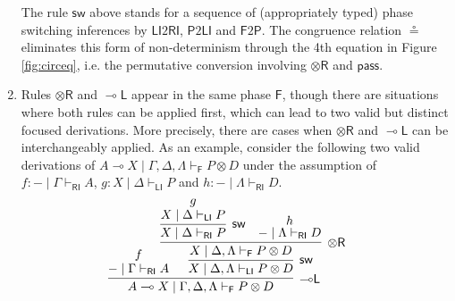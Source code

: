 \documentclass[copyright,creativecommons]{eptcs}
\theoremstyle{definition}
\newcommand{\tr}{\otimes \mathsf{R}}
\newcommand{\lleft}{{\multimap}\mathsf{L}}
\newcommand{\pass}{\mathsf{pass}}
\newcommand{\ot}{\otimes}
\newcommand{\lolli}{\multimap}
\newcommand{\RI}{\mathsf{RI}}
\newcommand{\LI}{\mathsf{LI}}
\newcommand{\Pass}{\mathsf{P}}
\newcommand{\F}{\mathsf{F}}
\newcommand{\proofbox}[1]{\begin{tabular}{l} #1 \end{tabular}}
\begin{document}
\begin{enumerate}
  The rule $\mathsf{sw}$ above stands for a sequence of (appropriately typed) phase
  switching inferences by $\LI2\RI$, $\Pass2\LI$ and $\F2\Pass$.
  The congruence relation $\circeq$ eliminates this form of non-determinism through the 4th equation in Figure \ref{fig:circeq}, i.e. the permutative conversion involving $\tr$ and $\pass$.
  \item Rules $\tr$ and $\lleft$ appear in the same phase $\F$, though there are situations where both rules can be applied first, which can lead to two valid but distinct focused derivations. More precisely, there are cases when $\tr$ and $\lleft$ can be interchangeably applied. As an example, consider the following two valid derivations of $A \lolli X \mid \Gamma , \Delta , \Lambda \vdash_{\F} P \ot D$ under the assumption of $f : {-} \mid \Gamma \vdash_{\RI} A$, $g : X \mid \Delta \vdash_{\LI} P$ and $h : {-} \mid \Lambda \vdash_{\RI} D$.
    \begin{equation}\label{eq:llefttr}
      \hspace{-.5cm}
      \proofbox{
      \infer[\lleft]{A \lolli X \mid \Gamma , \Delta , \Lambda \vdash_{\F} P \ot D}{
        \deduce{{-} \mid \Gamma \vdash_{\RI} A}{f}
        &\hspace{-.6cm}
        \infer[\mathsf{sw}]{X \mid \Delta , \Lambda \vdash_{\LI} P \ot D}{
          \infer[\tr]{X \mid \Delta , \Lambda \vdash_{\F} P\ot D}{
            \infer[\mathsf{sw}]{X \mid \Delta \vdash_{\RI} P}{
              \deduce{X \mid \Delta \vdash_{\LI} P}{g}
            }
            &
            \deduce{{-} \mid \Lambda \vdash_{\RI} D}{h}
}}}}
\end{equation}
\end{enumerate}
\end{document}
